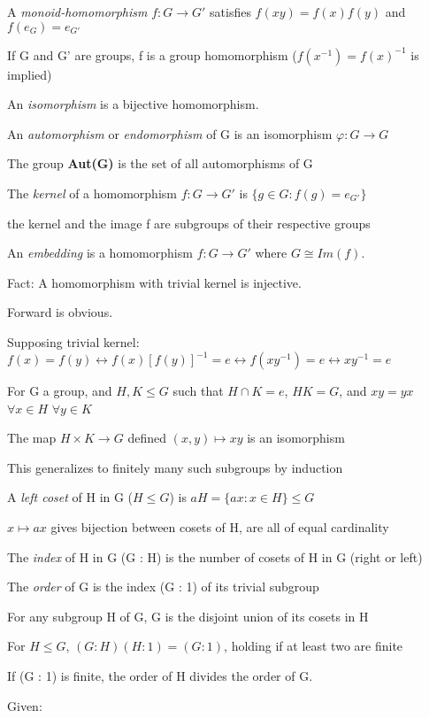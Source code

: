 \documentclass[12pt]{article}
\begin{document}
\noindent
A \textit{monoid-homomorphism} $f: G \to G'$ satisfies $f(xy) = f(x)f(y)$ and $f(e_G) = e_{G'}$

If G and G' are groups, f is a group homomorphism ($f(x^{-1}) = f(x)^{-1}$ is implied)

\noindent
An \textit{isomorphism} is a bijective homomorphism.

An \textit{automorphism} or \textit{endomorphism} of G is an isomorphism $\varphi: G \to G$

\noindent
The group \textbf{Aut(G)} is the set of all automorphisms of G

\noindent
The \textit{kernel} of a homomorphism $f: G \to G'$ is $\{g \in G : f(g) = e_{G'}\}$

the kernel and the image f are subgroups of their respective groups

\noindent
An \textit{embedding} is a homomorphism $f: G \to G'$ where $G \cong Im(f)$.

\noindent
Fact: A homomorphism with trivial kernel is injective.

Forward is obvious.

Supposing trivial kernel: $f(x) = f(y) \leftrightarrow f(x)[f(y)]^{-1} = e \leftrightarrow f(xy^{-1}) = e \leftrightarrow xy^{-1} = e$

\noindent
For G a group, and $H, K \leq G$ such that $H \cap K = e$, $HK = G$, and $xy=yx$ $\forall x \in H$ $\forall y \in K$

The map $H \times K \to G$ defined $(x, y) \mapsto xy$ is an isomorphism

This generalizes to finitely many such subgroups by induction

\noindent
A \textit{left coset} of H in G ($H \leq G$) is $aH = \{ax : x \in H\} \leq G$

$x \mapsto ax$ gives bijection between cosets of H, are all of equal cardinality

The \textit{index} of H in G (G : H) is the number of cosets of H in G (right or left)

The \textit{order} of G is the index (G : 1) of its trivial subgroup

\noindent
For any subgroup H of G, G is the disjoint union of its cosets in H

\noindent
For $H \leq G$, $(G : H)(H : 1) = (G : 1)$, holding if at least two are finite

If (G : 1) is finite, the order of H divides the order of G.

\noindent
Given:
\end{document}
